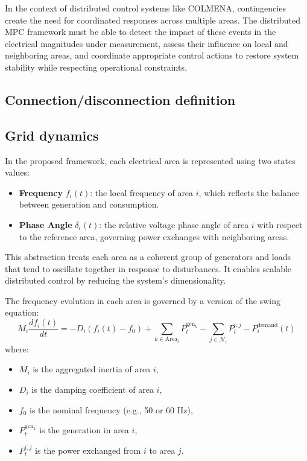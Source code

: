\documentclass{article}
\begin{document}
In the context of distributed control systems like COLMENA, contingencies create the need for coordinated responses across multiple areas. The distributed MPC framework must be able to detect the impact of these events in the electrical magnitudes under measurement, assess their influence on local and neighboring areas, and coordinate appropriate control actions to restore system stability while respecting operational constraints.

\subsection{Connection/disconnection definition}

\subsection{Grid dynamics}
In the proposed framework, each electrical area is represented using two states values:
\begin{itemize}
    \item \textbf{Frequency} $f_i(t)$: the local frequency of area $i$, which reflects the balance between generation and consumption.
    \item \textbf{Phase Angle} $\delta_i(t)$: the relative voltage phase angle of area $i$ with respect to the reference area, governing power exchanges with neighboring areas.
\end{itemize}
This abstraction treats each area as a coherent group of generators and loads that tend to oscillate together in response to disturbances. It enables scalable distributed control by reducing the system's dimensionality.

The frequency evolution in each area is governed by a version of the swing equation:
\begin{equation}
    M_i \frac{df_i(t)}{dt} = -D_i(f_i(t) - f_0) + \sum_{k \in \text{Area}_i} P^{\text{gen}_k}_{t} - \sum_{j \in \mathcal{N}_i} P^{i,j}_t - P^{\text{demand}}_i(t)
\end{equation}
where:
\begin{itemize}
    \item $M_i$ is the aggregated inertia of area $i$,
    \item $D_i$ is the damping coefficient of area $i$,
    \item $f_0$ is the nominal frequency (e.g., 50 or 60 Hz),
    \item $P^{\text{gen}_k}_t$ is the generation in area $i$,
    \item $P^{i,j}_t$ is the power exchanged from $i$ to area $j$.
\end{itemize}
\end{document}
